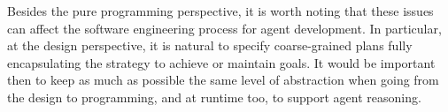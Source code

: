 %

%


\noindent Besides the pure programming perspective, it is worth noting that
these issues can affect the %
software engineering process for agent development.
In particular, at the design perspective, it is natural to specify
coarse-grained plans fully encapsulating the strategy to achieve or
maintain goals.
%
It would be important then to keep as much as possible the same level
of abstraction when going from the design to programming, and at
runtime too, to support agent reasoning.


%
%


